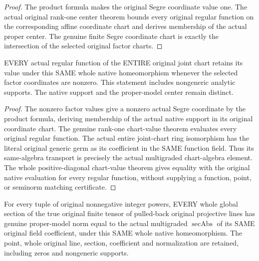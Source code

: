 \begin{proof}
The product formula makes the original Segre coordinate value one. The actual original rank-one center theorem bounds every original regular function on the corresponding affine coordinate chart and derives membership of the actual proper center. The genuine finite Segre coordinate chart is exactly the intersection of the selected original factor charts.
\end{proof}
\begin{theorem}\label{thm:original-family-native-whole-chart-values}
\leanok
{}
EVERY actual regular function of the ENTIRE original joint chart retains its value under this SAME whole native homeomorphism whenever the selected factor coordinates are nonzero. This statement includes nongeneric analytic supports. The native support and the proper-model center remain distinct.
\end{theorem}
\begin{proof}
The nonzero factor values give a nonzero actual Segre coordinate by the product formula, deriving membership of the actual native support in its original coordinate chart. The genuine rank-one chart-value theorem evaluates every original regular function. The actual entire joint-chart ring isomorphism has the literal original generic germ as its coefficient in the SAME function field. Thus its same-algebra transport is precisely the actual multigraded chart-algebra element. The whole positive-diagonal chart-value theorem gives equality with the original native evaluation for every regular function, without supplying a function, point, or seminorm matching certificate.
\end{proof}
\begin{theorem}\label{thm:original-family-whole-tensor-model-norm}
\leanok
{}
For every tuple of original nonnegative integer powers, EVERY whole global section of the true original finite tensor of pulled-back original projective lines has genuine proper-model norm equal to the actual multigraded $\operatorname{secAbs}$ of its SAME original field coefficient, under this SAME whole native homeomorphism. The point, whole original line, section, coefficient and normalization are retained, including zeros and nongeneric supports.
\end{theorem}
